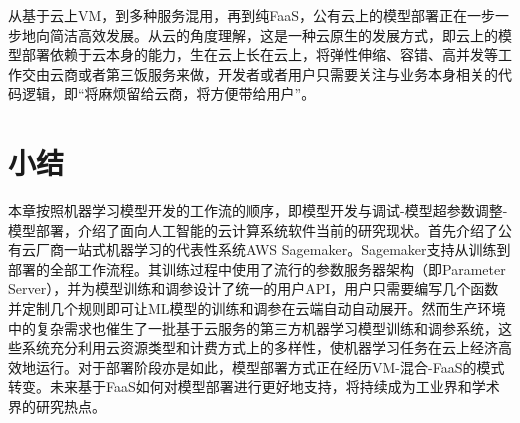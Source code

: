 从基于云上VM，到多种服务混用，再到纯FaaS，公有云上的模型部署正在一步一步地向简洁高效发展。从云的角度理解，这是一种云原生的发展方式，即云上的模型部署依赖于云本身的能力，生在云上长在云上，将弹性伸缩、容错、高并发等工作交由云商或者第三饭服务来做，开发者或者用户只需要关注与业务本身相关的代码逻辑，即“将麻烦留给云商，将方便带给用户”。

\section{小结}
本章按照机器学习模型开发的工作流的顺序，即模型开发与调试-模型超参数调整-模型部署，介绍了面向人工智能的云计算系统软件当前的研究现状。首先介绍了公有云厂商一站式机器学习的代表性系统AWS Sagemaker。Sagemaker支持从训练到部署的全部工作流程。其训练过程中使用了流行的参数服务器架构（即Parameter Server），并为模型训练和调参设计了统一的用户API，用户只需要编写几个函数并定制几个规则即可让ML模型的训练和调参在云端自动自动展开。然而生产环境中的复杂需求也催生了一批基于云服务的第三方机器学习模型训练和调参系统，这些系统充分利用云资源类型和计费方式上的多样性，使机器学习任务在云上经济高效地运行。对于部署阶段亦是如此，模型部署方式正在经历VM-混合-FaaS的模式转变。未来基于FaaS如何对模型部署进行更好地支持，将持续成为工业界和学术界的研究热点。
